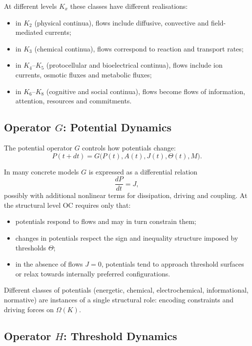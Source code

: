 At different levels \(K_x\) these classes have different realisations:
\begin{itemize}
  \item in \(K_2\) (physical continua), flows include diffusive, convective and
        field-mediated currents;
  \item in \(K_3\) (chemical continua), flows correspond to reaction and
        transport rates;
  \item in \(K_4\)–\(K_5\) (protocellular and bioelectrical continua), flows
        include ion currents, osmotic fluxes and metabolic fluxes;
  \item in \(K_6\)–\(K_8\) (cognitive and social continua), flows become flows
        of information, attention, resources and commitments.
\end{itemize}

\subsection{Operator \texorpdfstring{\texorpdfstring{$G$}{G}}{G}: Potential Dynamics}

The potential operator \(G\) controls how potentials change:
\[
  P(t+dt) = G\big(P(t), A(t), J(t), \Theta(t), M\big).
\]

In many concrete models \(G\) is expressed as a differential relation
\[
  \frac{dP}{dt} = J,
\]
possibly with additional nonlinear terms for dissipation, driving and coupling.
At the structural level OC requires only that:
\begin{itemize}
  \item potentials respond to flows and may in turn constrain them;
  \item changes in potentials respect the sign and inequality structure
        imposed by thresholds \(\Theta\);
  \item in the absence of flows \(J = 0\), potentials tend to approach
        threshold surfaces or relax towards internally preferred configurations.
\end{itemize}

Different classes of potentials (energetic, chemical, electrochemical,
informational, normative) are instances of a single structural role:
encoding constraints and driving forces on \(\Omega(K)\).

\subsection{Operator \texorpdfstring{\texorpdfstring{$H$}{H}}{H}: Threshold Dynamics}

